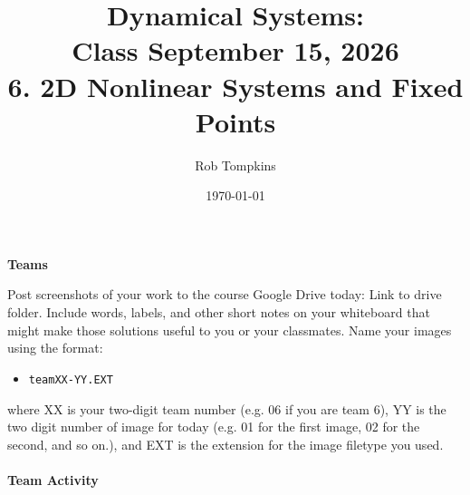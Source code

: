 \documentclass[12pt]{amsart}
\title{Dynamical Systems:\\Class September 15, 2026\\ 6. 2D Nonlinear Systems and Fixed Points}
\author{Rob Tompkins}
\date{\today}
\theoremstyle{conjecture}
\theoremstyle{definition}
\theoremstyle{question}
\theoremstyle{theorem}
\begin{document}
    \maketitle
    {\large\bfseries Teams}

    Post screenshots of your work to the course Google Drive today: Link to drive folder. Include words, labels, and other short notes on your whiteboard that might make those solutions useful to you or your classmates. Name your images using the format:
    \begin{itemize}\item \texttt{teamXX-YY.EXT}\end{itemize}
    where XX is your two-digit team number (e.g. 06 if you are team 6), YY is the two digit number of image for today (e.g. 01 for the first image, 02 for the second, and so on.), and EXT is the extension for the image filetype you used.
    \qquad\\
    \qquad\\
    {\large\bfseries Team Activity}
\end{document}
